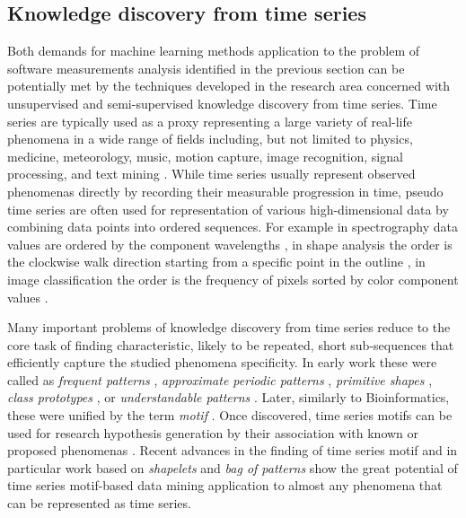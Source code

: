%
%
\subsection{Knowledge discovery from time series}\label{section_timeseries_kdd}
Both demands for machine learning methods application to the problem of software measurements analysis
identified in the previous section can be potentially met by the techniques developed in the research 
area concerned with unsupervised and semi-supervised knowledge discovery from time series.
Time series are typically used as a proxy representing a large variety of real-life 
phenomena in a wide range of fields including, but not limited to physics, medicine, meteorology, music, 
motion capture, image recognition, signal processing, and text mining \cite{citeulike:11796594}. 
While time series usually represent observed phenomenas directly by recording their measurable 
progression in time, pseudo time series are often used for representation of various high-dimensional 
data by combining data points into ordered sequences. 
For example in spectrography data values are ordered by the component wavelengths \cite{citeulike:12550833},
in shape analysis the order is the clockwise walk direction starting from a specific point in the outline 
\cite{citeulike:12550835}, in image classification the order is the frequency of pixels sorted by color component 
values \cite{citeulike:2900542}.

Many important problems of knowledge discovery from time series reduce to the core task of finding 
characteristic, likely to be repeated, short sub-sequences that efficiently capture the studied 
phenomena specificity. In early work these were called as 
\textit{frequent patterns} \cite{citeulike:5159615}, 
\textit{approximate periodic patterns} \cite{citeulike:1959582},
\textit{primitive shapes} \cite{citeulike:5898869}, 
\textit{class prototypes} \cite{citeulike:4406444}, 
or \textit{understandable patterns} \cite{citeulike:3978076}. 
Later, similarly to Bioinformatics, these were unified by the term \textit{motif} \cite{citeulike:3977965}.
Once discovered, time series motifs can be used for research hypothesis generation by their association 
with known or proposed phenomenas \cite{citeulike:3977965}. 
Recent advances in the finding of time series motif and in particular work based on \textit{shapelets} 
\cite{citeulike:7344347} \cite{citeulike:11957982} \cite{citeulike:12552293} and \textit{bag of patterns} 
\cite{citeulike:10525778} show the great potential of time series motif-based data mining application
to almost any phenomena that can be represented as time series.

